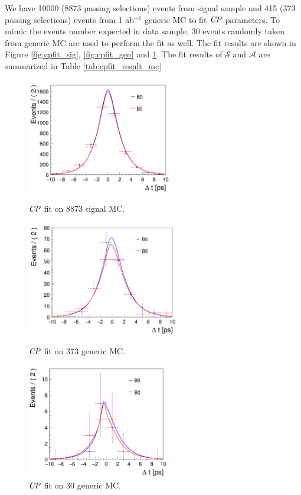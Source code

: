 We have 10000 (8873 passing selections) events from signal sample and 415 (373 passing selections) events from 1 ab$^{-1}$ generic MC to fit $\it{CP}$ parameters. To mimic the events number expected in data sample, 30 events randomly taken from generic MC are used to perform the fit as well. The fit results are shown in Figure \ref{fig:cpfit_sig}, \ref{fig:cpfit_gen} and \ref{fig:cpfit_gen_data}. The fit results of $\mathcal{S}$ and $\mathcal{A}$ are summarized in Table \ref{tab:cpfit_result_mc}
\begin{figure}[H]
	\begin{minipage}{0.5\linewidth}
		\includegraphics[height=5cm]{figures/cpfit-10000sig}
		\caption{$\it{CP}$ fit on 8873 signal MC.}
		\label{fig:cpfit_sig}
	\end{minipage}
	\begin{minipage}{0.5\linewidth}
		\includegraphics[height=5cm]{figures/cpfit-373gen}
		\caption{$\it{CP}$ fit on 373 generic MC.}
		\label{fig:cpfit_gen}
	\end{minipage}
	\begin{minipage}{0.5\linewidth}
		\includegraphics[height=5cm]{figures/cpfit-30gen}
		\caption{$\it{CP}$ fit on 30 generic MC.}
		\label{fig:cpfit_gen_data}
	\end{minipage}
\end{figure}



